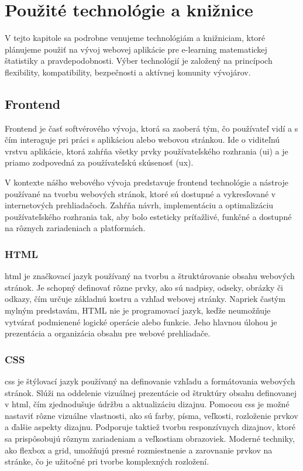 \section{Použité technológie a knižnice}
V tejto kapitole sa podrobne venujeme technológiám a knižniciam, ktoré plánujeme
použiť na vývoj webovej aplikácie pre e-learning matematickej štatistiky a
pravdepodobnosti. Výber technológií je založený na princípoch flexibility,
kompatibility, bezpečnosti a aktívnej komunity vývojárov.


\subsection{Frontend}
Frontend je časť softvérového vývoja, ktorá sa zaoberá tým, čo používateľ vidí a s čím interaguje pri práci s aplikáciou alebo webovou stránkou. 
Ide o viditeľnú vrstvu aplikácie, ktorá zahŕňa všetky prvky používateľského rozhrania (\acrshort{ui}) a je priamo zodpovedná za používateľskú skúsenosť (\acrshort{ux}).

V kontexte nášho webového vývoja predstavuje frontend technológie a nástroje používané na tvorbu webových stránok, ktoré sú dostupné a vykresľované v internetových prehliadačoch. 
Zahŕňa návrh, implementáciu a optimalizáciu používateľského rozhrania tak, aby bolo esteticky príťažlivé, funkčné a dostupné na rôznych zariadeniach a platformách.
\subsubsection{HTML}
\acrfull{html} je značkovací jazyk používaný na tvorbu a štruktúrovanie obsahu webových stránok.
Je schopný definovať rôzne prvky, ako sú nadpisy, odseky, obrázky či odkazy, čím určuje základnú kostru a vzhľad webovej stránky.
Napriek častým mylným predstavám, HTML nie je programovací jazyk, keďže neumožňuje vytvárať podmienené logické operácie alebo funkcie.
Jeho hlavnou úlohou je prezentácia a organizácia obsahu pre webové prehliadače. 
\cite{HTML}

\subsubsection{CSS}
\acrfull{css} je štýlovací jazyk používaný na definovanie vzhľadu a formátovania webových stránok. 
Slúži na oddelenie vizuálnej prezentácie od štruktúry obsahu definovanej v \acrshort{html}, čím zjednodušuje údržbu a aktualizáciu dizajnu.
Pomocou \acrshort{css} je možné nastaviť rôzne vizuálne vlastnosti, ako sú farby, písma, veľkosti, rozloženie prvkov a ďalšie aspekty dizajnu.
 Podporuje taktiež tvorbu responzívnych dizajnov, ktoré sa prispôsobujú rôznym zariadeniam a veľkostiam obrazoviek. 
 Moderné techniky, ako flexbox a grid, umožňujú presné rozmiestnenie a zarovnanie prvkov na stránke, čo je užitočné pri tvorbe komplexných rozložení.\cite{css}

